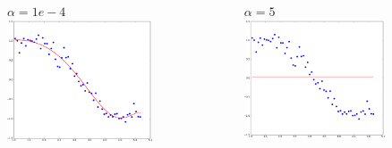 \documentclass[handout]{beamer}
\begin{document}
\begin{frame}
\begin{columns}
\vspace{-2em}
\begin{figure}
$\alpha=1e-4$
\includegraphics[width=0.99\textwidth]{./fig/L1/lasso_alpha1e-4.png}
\end{figure}
\vspace{-2em}
\begin{figure}
$\alpha=5$
\includegraphics[width=0.99\textwidth]{./fig/L1/lasso_alpha5.png}
\end{figure}
\end{columns}
\end{frame}
\end{document}
